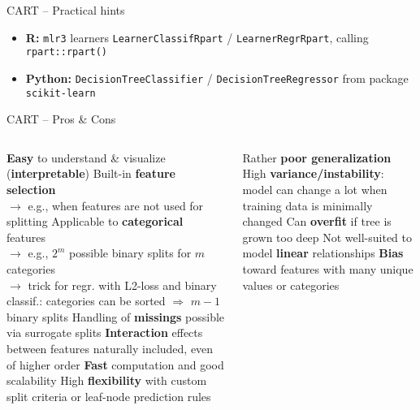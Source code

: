 \begin{frame}{CART -- Practical hints}
\medskip

\begin{itemize}
  \item \textbf{R:} \texttt{mlr3} learners \texttt{LearnerClassifRpart} / 
    \texttt{LearnerRegrRpart}, calling \texttt{rpart::rpart()}
  \item \textbf{Python:} \texttt{DecisionTreeClassifier} / 
  \texttt{DecisionTreeRegressor} from package \texttt{scikit-learn}
\end{itemize}

\end{frame}

\begin{frame}{CART -- Pros \& Cons}

\begin{columns}[onlytextwidth]
  \begin{column}{0.5\textwidth}
    \footnotesize
    \begin{itemize}
      \positem \textbf{Easy} to understand \& visualize (\textbf{interpretable})
      \positem Built-in \textbf{feature selection}\\
      $\rightarrow$ e.g., when features are not used for splitting
      \positem Applicable to \textbf{categorical} features \\
      $\rightarrow$ e.g., $2^m$ possible binary splits for $m$ categories\\
       $\rightarrow$ trick for regr. with L2-loss and binary classif.: categories can be sorted $\Rightarrow$ $m-1$ binary splits 
      \positem Handling of \textbf{missings} possible via surrogate splits
      \positem \textbf{Interaction} effects between features naturally included, 
      even of higher order
      \positem \textbf{Fast} computation and good scalability
      \positem High \textbf{flexibility} with custom split criteria or leaf-node 
      prediction rules
    \end{itemize}
  \end{column}
  \begin{column}{0.5\textwidth}
    \footnotesize
    \begin{itemize}
      \negitem Rather \textbf{poor generalization} %
      \negitem High \textbf{variance/instability}: model can change a lot when training data is minimally changed
      \negitem Can \textbf{overfit} if tree is grown too deep
      \negitem Not well-suited to model \textbf{linear} relationships
      \negitem \textbf{Bias} toward features with many unique values or categories
    \end{itemize}
  \end{column}
\end{columns}

\vfill

\small


\end{frame}

